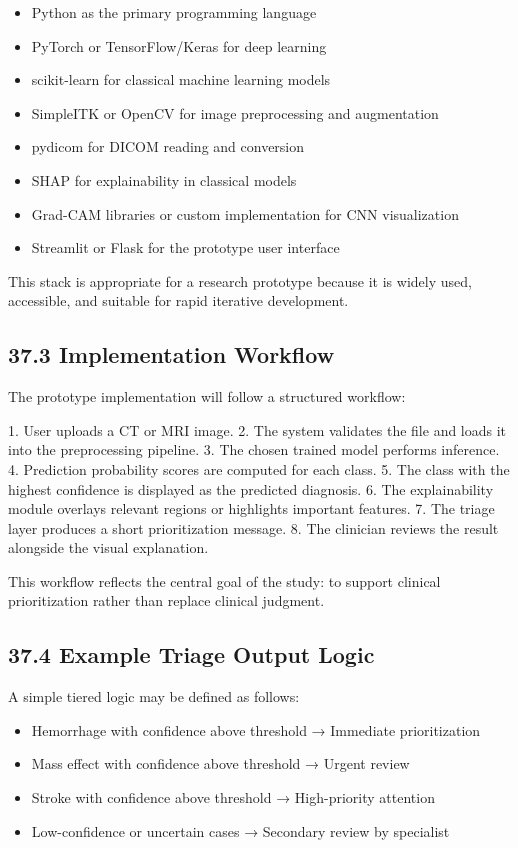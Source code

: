 \documentclass[12pt,a4paper]{report}
\begin{document}
\begin{itemize}
\item Python as the primary programming language
\item PyTorch or TensorFlow/Keras for deep learning
\item scikit-learn for classical machine learning models
\item SimpleITK or OpenCV for image preprocessing and augmentation
\item pydicom for DICOM reading and conversion
\item SHAP for explainability in classical models
\item Grad-CAM libraries or custom implementation for CNN visualization
\item Streamlit or Flask for the prototype user interface
\end{itemize}

This stack is appropriate for a research prototype because it is widely used, accessible, and suitable for rapid iterative development.

\subsection{37.3 Implementation Workflow}

The prototype implementation will follow a structured workflow:

1. User uploads a CT or MRI image.
2. The system validates the file and loads it into the preprocessing pipeline.
3. The chosen trained model performs inference.
4. Prediction probability scores are computed for each class.
5. The class with the highest confidence is displayed as the predicted diagnosis.
6. The explainability module overlays relevant regions or highlights important features.
7. The triage layer produces a short prioritization message.
8. The clinician reviews the result alongside the visual explanation.

This workflow reflects the central goal of the study: to support clinical prioritization rather than replace clinical judgment.

\subsection{37.4 Example Triage Output Logic}

A simple tiered logic may be defined as follows:

\begin{itemize}
\item Hemorrhage with confidence above threshold → Immediate prioritization
\item Mass effect with confidence above threshold → Urgent review
\item Stroke with confidence above threshold → High-priority attention
\item Low-confidence or uncertain cases → Secondary review by specialist
\end{itemize}
\end{document}
